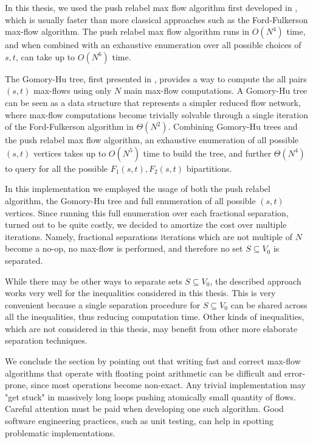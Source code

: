 In this thesis, we used the push relabel max flow algorithm first developed in \cite{goldberg1997}, which is usually faster than more classical approaches such as the Ford-Fulkerson max-flow algorithm.
The push relabel max flow algorithm runs in $O(N^4)$ time, and when combined with an exhaustive enumeration over all possible choices of $s, t$, can take up to $O(N^6)$ time.

The Gomory-Hu tree, first presented in \cite{gomory1961}, provides a way to compute the all pairs $(s, t)$ max-flows using only $N$ main max-flow computations.
A Gomory-Hu tree can be seen as a data structure that represents a simpler reduced flow network, where max-flow computations become trivially solvable through a single iteration of the Ford-Fulkerson algorithm in $\Theta(N^2)$.
Combining Gomory-Hu trees and the push relabel max flow algorithm, an exhaustive enumeration of all possible $(s, t)$ vertices takes up to $O(N^5)$ time to build the tree, and further $\Theta(N^4)$ to query for all the possible $F_1(s, t), F_2(s, t)$ bipartitions.

In this implementation we employed the usage of both the push relabel algorithm, the Gomory-Hu tree and full enumeration of all possible $(s, t)$ vertices.
Since running this full enumeration over each fractional separation, turned out to be quite costly, we decided to amortize the cost over multiple iterations.
Namely, fractional separations iterations which are not multiple of $N$ become a no-op, no max-flow is performed, and therefore no set $S \subseteq V_0$ is separated.

While there may be other ways to separate sets $S \subseteq V_0$, the described approach works very well for the inequalities considered in this thesis.
This is very convenient because a single separation procedure for $S \subseteq V_0$ can be shared across all the inequalities, thus reducing computation time.
Other kinds of inequalities, which are not considered in this thesis, may benefit from other more elaborate separation techniques.

We conclude the section by pointing out that writing fast and correct max-flow algorithms that operate with floating point arithmetic can be difficult and error-prone, since most operations become non-exact.
Any trivial implementation may "get stuck" in massively long loops pushing atomically small quantity of flows.
Careful attention must be paid when developing one such algorithm.
Good software engineering practices, such as unit testing, can help in spotting problematic implementations.

